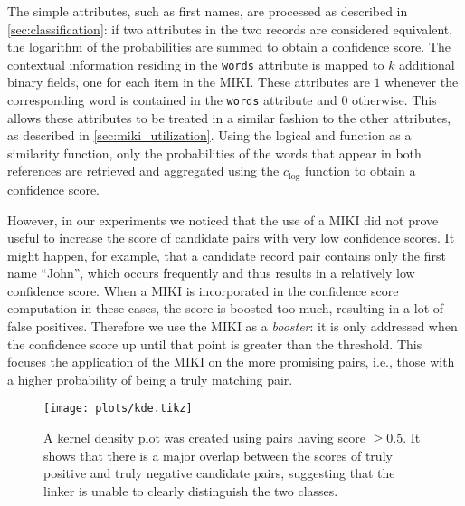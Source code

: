 The simple attributes, such as first names, are processed as described in \cref{sec:classification}: if two attributes in the two records are considered equivalent, the logarithm of the probabilities are summed to obtain a confidence score.
The contextual information residing in the \texttt{words} attribute is mapped to $k$ additional binary fields, one for each item in the MIKI.
These attributes are $1$ whenever the corresponding word is contained in the \texttt{words} attribute and $0$ otherwise.
This allows these attributes to be treated in a similar fashion to the other attributes, as described in \cref{sec:miki_utilization}.
Using the logical and function as a similarity function, only the probabilities of the words that appear in both references are retrieved and aggregated using the $c_{\mathrm{log}}$ function to obtain a confidence score.

However, in our experiments we noticed that the use of a MIKI did not prove useful to increase the score of candidate pairs with very low confidence scores.
It might happen, for example, that a candidate record pair contains only the first name ``John'', which occurs frequently and thus results in a relatively low confidence score.
When a MIKI is incorporated in the confidence score computation in these cases, the score is boosted too much, resulting in a lot of false positives.
Therefore we use the MIKI as a \emph{booster}: it is only addressed when the confidence score up until that point is greater than the threshold.
This focuses the application of the MIKI on the more promising pairs, i.e., those with a higher probability of being a truly matching pair.

\begin{figure}
    \centering
    \texttt{[image: plots/kde.tikz]}
    \caption{A kernel density plot was created using pairs having score $\geq 0.5$. It shows that there is a major overlap between the scores of truly positive and truly negative candidate pairs, suggesting that the linker is unable to clearly distinguish the two classes.}
    \label{fig:kde}
\end{figure}

